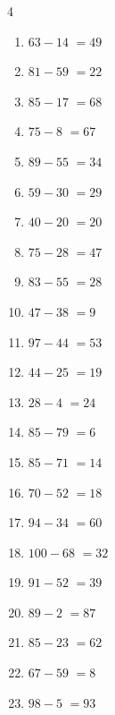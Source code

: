 \begin{multicols}{4}
\begin{enumerate}
  \item $63-14$
        $=49$

  \item $81-59$
        $=22$

  \item $85-17$
        $=68$

  \item $75-8$
        $=67$

  \item $89-55$
        $=34$

  \item $59-30$
        $=29$

  \item $40-20$
        $=20$

  \item $75-28$
        $=47$

  \item $83-55$
        $=28$

  \item $47-38$
        $=9$

  \item $97-44$
        $=53$

  \item $44-25$
        $=19$

  \item $28-4$
        $=24$

  \item $85-79$
        $=6$

  \item $85-71$
        $=14$

  \item $70-52$
        $=18$

  \item $94-34$
        $=60$

  \item $100-68$
        $=32$

  \item $91-52$
        $=39$

  \item $89-2$
        $=87$

  \item $85-23$
        $=62$

\columnbreak %

  \item $67-59$
        $=8$

  \item $98-5$
        $=93$


\end{enumerate}
\end{multicols}
